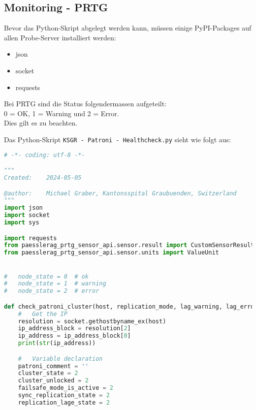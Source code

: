 
\begin{flushleft}
    \section{Monitoring - \Gls{PRTG}}
    \label{sec:monitoring}
    Bevor das Python-Skript abgelegt werden kann, müssen einige PyPI-Packages auf allen Probe-Server installiert werden:
    \begin{itemize}
        \item json
        \item socket
        \item requests
    \end{itemize}
\end{flushleft}
\begin{flushleft}
    \begin{warning}
        Bei \Gls{PRTG} sind die Status folgendermassen aufgeteilt:\\
        0 = OK, 1 = Warning und 2 = Error.\\
        Dies gilt es zu beachten.
    \end{warning}
    Das Python-Skript \texttt{KSGR - Patroni - Healthcheck.py} sieht wie folgt aus:
    \lstset{style=gra_codestyle}
    \begin{lstlisting}[language=python, caption=Monitoring - KSGR - Patroni - Healthcheck.py,captionpos=b,label={lst:monitoring-python},breaklines=true]
# -*- coding: utf-8 -*-

"""
Created:    2024-05-05

@author:    Michael Graber, Kantonsspital Graubuenden, Switzerland
"""
import json
import socket
import sys

import requests
from paesslerag_prtg_sensor_api.sensor.result import CustomSensorResult
from paesslerag_prtg_sensor_api.sensor.units import ValueUnit


#   node_state = 0  # ok
#   node_state = 1  # warning
#   node_state = 2  # error

def check_patroni_cluster(host, replication_mode, lag_warning, lag_error):
    #   Get the IP
    resolution = socket.gethostbyname_ex(host)
    ip_address_block = resolution[2]
    ip_address = ip_address_block[0]
    print(str(ip_address))

    #   Variable declaration
    patroni_comment = ''
    cluster_state = 2
    cluster_unlocked = 2
    failsafe_mode_is_active = 2
    sync_replication_state = 2
    replication_lage_state = 2


\end{lstlisting}
\end{flushleft}
